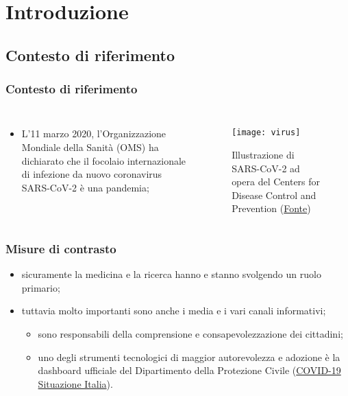 \documentclass[../../main.tex]{subfiles}
\begin{document}
\section{Introduzione}

\subsection{Contesto di riferimento}
\begin{frame}
    \frametitle{Contesto di riferimento}
    
    \begin{columns}
        
        \begin{itemize}
            \item L'11 marzo 2020, l'Organizzazione Mondiale della Sanità (OMS) ha dichiarato che il focolaio internazionale di infezione da nuovo coronavirus SARS-CoV-2 è una pandemia; 
        \end{itemize}

        \begin{figure}
            \texttt{[image: virus]}
            \caption{Illustrazione di SARS-CoV-2 ad opera del Centers for Disease Control and Prevention (\href{https://phil.cdc.gov/Details.aspx?pid=23312}{Fonte})}
        \end{figure}
        
    \end{columns}

\end{frame}

\begin{frame}
    \frametitle{Misure di contrasto}

    \begin{itemize}
        \item<1-> sicuramente la medicina e la ricerca hanno e stanno svolgendo
        un ruolo primario;
        \item<2-> tuttavia molto importanti sono anche i media e i vari canali informativi;
        \begin{itemize}
            \item sono responsabili della comprensione e \alert{consapevolezzazione dei cittadini};
            \item uno degli strumenti tecnologici di maggior autorevolezza e adozione è la dashboard ufficiale del Dipartimento della Protezione Civile (\href{https://opendatadpc.maps.arcgis.com/apps/opsdashboard/index.html\#/b0c68bce2cce478eaac82fe38d4138b1}{COVID-19 Situazione Italia}).
        \end{itemize}              

    \end{itemize}

\end{frame}
\end{document}
